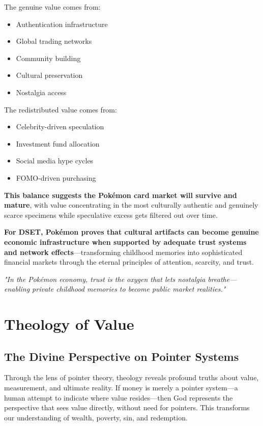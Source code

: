 \documentclass[11pt,oneside]{book}
\begin{document}
The genuine value comes from:
\begin{itemize}
\item Authentication infrastructure
\item Global trading networks
\item Community building
\item Cultural preservation
\item Nostalgia access
\end{itemize}

The redistributed value comes from:
\begin{itemize}
\item Celebrity-driven speculation
\item Investment fund allocation
\item Social media hype cycles
\item FOMO-driven purchasing
\end{itemize}

\textbf{This balance suggests the Pokémon card market will survive and mature}, with value concentrating in the most culturally authentic and genuinely scarce specimens while speculative excess gets filtered out over time.

\textbf{For DSET, Pokémon proves that cultural artifacts can become genuine economic infrastructure when supported by adequate trust systems and network effects}—transforming childhood memories into sophisticated financial markets through the eternal principles of attention, scarcity, and trust.

\textit{"In the Pokémon economy, trust is the oxygen that lets nostalgia breathe—enabling private childhood memories to become public market realities."}

\chapter{Theology of Value}

\section{The Divine Perspective on Pointer Systems}

Through the lens of pointer theory, theology reveals profound truths about value, measurement, and ultimate reality. If money is merely a pointer system—a human attempt to indicate where value resides—then God represents the perspective that sees value directly, without need for pointers. This transforms our understanding of wealth, poverty, sin, and redemption.
\end{document}
